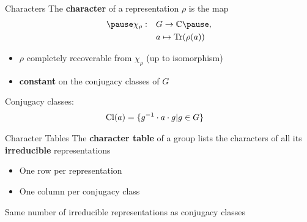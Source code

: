 \begin{frame}{Characters}
    \large
    The \textbf{character} of a representation $\rho$ is the map
    \Large
    \begin{align*}
        \pause
        \chi_\rho: \quad & G \to \C \pause , \\
        & a \mapsto \Tr(\rho(a))
    \end{align*}
    
    \pause
    \large
    \begin{itemize}
        \item $\rho$ completely recoverable from $\chi_\rho$ (up to isomorphism) \pause
        \item \textbf{constant} on the conjugacy classes of $G$
    \end{itemize}

    \vspace{1em}
    \pause
    Conjugacy classes:
    \begin{align*}
        \operatorname{Cl}(a) & = \{g^{-1} \cdot a \cdot g | g \in G \}
    \end{align*}

    \normalsize
    {\hspace*{\fill} \cite{fulton2013}}
    
\end{frame}

\begin{frame}{Character Tables}
    \large
    The \textbf{character table} of a group lists the characters of all its \textbf{irreducible} representations
    
    \pause
    \vspace{1em}
    \begin{itemize}
        \item One row per representation \pause
        \item One column per conjugacy class
    \end{itemize}
    
    \vspace{1em}
    \pause
    Same number of irreducible representations as conjugacy classes

    \vspace{1em}
    \normalsize
    {\hspace*{\fill} \cite{fulton2013}}

\end{frame}
